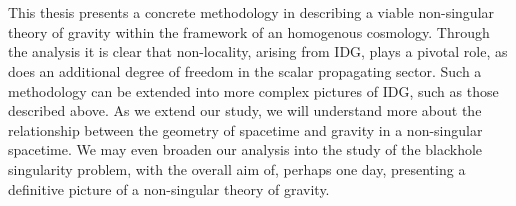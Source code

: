 \\\\
This thesis presents a concrete methodology in describing a viable non-singular theory of gravity within the framework of an homogenous cosmology. Through the analysis it is clear that non-locality, arising from IDG, plays a pivotal role, as does an additional degree of freedom in the scalar propagating sector. Such a methodology can be extended into more complex pictures of IDG, such as those described above. As we extend our study, we will understand more about the relationship between the geometry of spacetime and gravity in a non-singular spacetime. We may even broaden our analysis into the study of the blackhole singularity problem, with the overall aim of, perhaps one day, presenting a definitive picture of a non-singular theory of gravity.  


